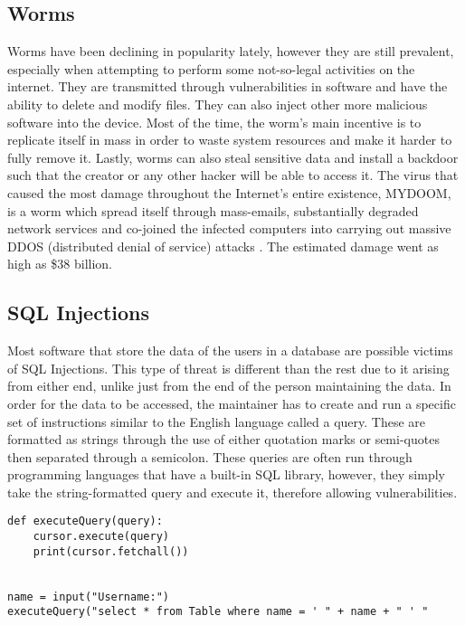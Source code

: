 \subsection{Worms}
\noindent Worms have been declining in popularity lately, however they are still prevalent, especially when attempting to perform some not-so-legal activities on the internet. They are transmitted through vulnerabilities in software and have the ability to delete and modify files. They can also inject other more malicious software into the device. Most of the time, the worm's main incentive is to replicate itself in mass in order to waste system resources and make it harder to fully remove it. Lastly, worms can also steal sensitive data and install a backdoor such that the creator or any other hacker will be able to access it. The virus that caused the most damage throughout the Internet's entire existence, MYDOOM, is a worm which spread itself through mass-emails, substantially degraded network services and co-joined the infected computers into carrying out massive DDOS (distributed denial of service) attacks \cite{wong2004study}. The estimated damage went as high as \$38 billion. 

\subsection{SQL Injections}
\noindent Most software that store the data of the users in a database are possible victims of SQL Injections. This type of threat is different than the rest due to it arising from either end, unlike just from the end of the person maintaining the data. In order for the data to be accessed, the maintainer has to create and run a specific set of instructions similar to the English language called a query. These are formatted as strings through the use of either quotation marks or semi-quotes then separated through a semicolon. These queries are often run through programming languages that have a built-in SQL library, however, they simply take the string-formatted query and execute it, therefore allowing vulnerabilities.

\begin{lstlisting}[caption = Undefended SQL Execution, columns=fixed, basewidth=0.5em, basicstyle={\ttfamily}, frame=single]
def executeQuery(query):
    cursor.execute(query)
    print(cursor.fetchall())


name = input("Username:")
executeQuery("select * from Table where name = ' " + name + " ' "
\end{lstlisting}

